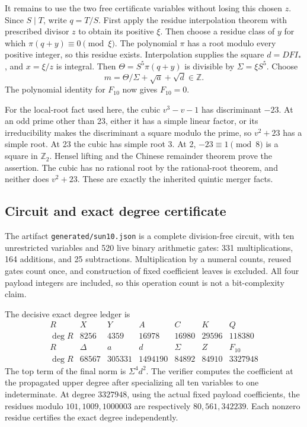 It remains to use the two free certificate variables without losing this
chosen \(z\). Since \(S\mid T\), write \(q=T/S\). First apply the
residue interpolation theorem with prescribed divisor \(z\) to obtain
its positive \(\xi\). Then choose a residue class of \(y\) for which
\(\pi(q+y)\equiv0\pmod\xi\). The polynomial \(\pi\) has a root modulo
every positive integer, so this residue exists. Interpolation supplies
the square \(d=DFI_*\), and \(x=\xi/z\) is integral. Then
\(\Theta=S^5\pi(q+y)\) is divisible by \(\Sigma=\xi S^5\). Choose \[
 m=\Theta/\Sigma+\sqrt a+\sqrt d\in\mathbb Z.
\] The polynomial identity for \(F_{10}\) now gives \(F_{10}=0\).

For the local-root fact used here, the cubic \(v^3-v-1\) has
discriminant \(-23\). At an odd prime other than 23, either it has a
simple linear factor, or its irreducibility makes the discriminant a
square modulo the prime, so \(v^2+23\) has a simple root. At 23 the
cubic has simple root 3. At 2, \(-23\equiv1\pmod8\) is a square in
\(\mathbb Z_2\). Hensel lifting and the Chinese remainder theorem prove
the assertion. The cubic has no rational root by the rational-root
theorem, and neither does \(v^2+23\). These are exactly the inherited
quintic merger facts.
\subsection{Circuit and exact degree certificate}
The artifact \texttt{generated/sun10.json} is a complete division-free circuit, with ten unrestricted variables and 520 live binary arithmetic gates: 331 multiplications, 164 additions, and 25 subtractions. Multiplication by a numeral counts, reused gates count once, and construction of fixed coefficient leaves is excluded. All four payload integers are included, so this operation count is not a bit-complexity claim.

The decisive exact degree ledger is
\[
\begin{array}{c|rrrrrr}
R&X&Y&A&C&K&Q\\\hline
\deg R&8256&4359&16978&16980&29596&118380\\
R&\Delta&a&d&\Sigma&Z&F_{10}\\\hline
\deg R&68567&305331&1494190&84892&84910&3327948
\end{array}
\]
The top term of the final norm is $\Sigma^4d^2$. The verifier computes the coefficient at the propagated upper degree after specializing all ten variables to one indeterminate. At degree $3327948$, using the actual fixed payload coefficients, the residues modulo $101,1009,1000003$ are respectively $80,561,342239$. Each nonzero residue certifies the exact degree independently.

